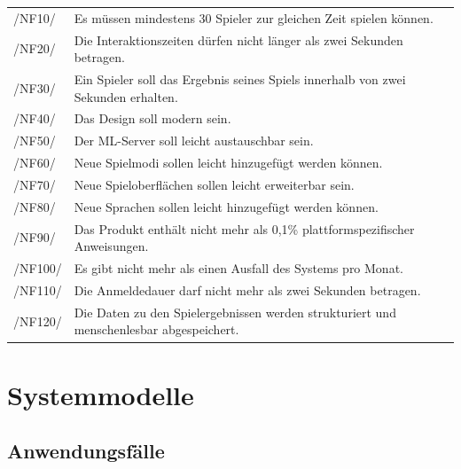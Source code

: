 \documentclass[a4paper]{scrreprt}
\begin{document}
    \begin{tabular}{ l l}
        /NF10/ & Es müssen mindestens 30 Spieler zur gleichen Zeit spielen können.\\
        /NF20/ & Die Interaktionszeiten dürfen nicht länger als zwei Sekunden betragen. \\
        /NF30/ & Ein Spieler soll das Ergebnis seines Spiels innerhalb von zwei Sekunden erhalten. \\
        /NF40/ & Das Design soll modern sein. \\
        /NF50/ & Der \Gls{ML-Server} soll leicht austauschbar sein. \\
        /NF60/ & Neue Spielmodi sollen leicht hinzugefügt werden können. \\
        /NF70/ & Neue Spieloberflächen sollen leicht erweiterbar sein. \\
        /NF80/ & Neue Sprachen sollen leicht hinzugefügt werden können. \\
        /NF90/ & Das Produkt enthält nicht mehr als 0,1\% plattformspezifischer Anweisungen. \\
        /NF100/ & Es gibt nicht mehr als einen Ausfall des Systems pro Monat. \\ %
        /NF110/ & Die Anmeldedauer darf nicht mehr als zwei Sekunden betragen. \\
        /NF120/ & Die Daten zu den Spielergebnissen werden strukturiert und menschenlesbar abgespeichert.\footnotemark\\
    \end{tabular}

    \chapter{Systemmodelle}
    \section{Anwendungsfälle}
\end{document}
